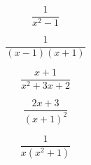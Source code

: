 \documentclass{article}
\begin{document}
\[
\frac{1}{x^2-1}
\]

\[
\frac{1}{(x-1)(x+1)}
\]

\[
\frac{x+1}{x^2+3x+2}
\]

\[
\frac{2x+3}{(x+1)^2}
\]

\[
\frac{1}{x(x^2+1)}
\]
\end{document}
